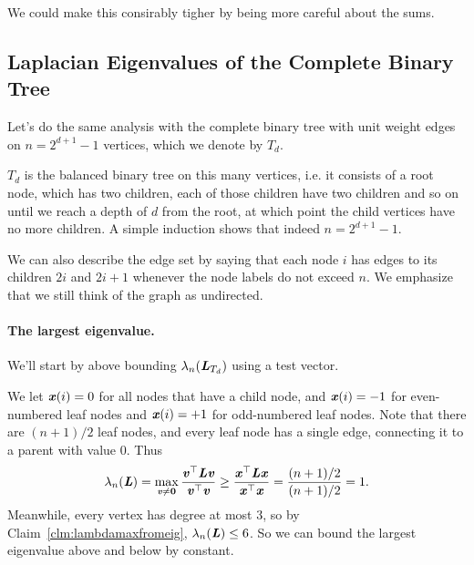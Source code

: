 We could make this consirably tigher by being more careful about the sums.

\subsection{Laplacian Eigenvalues of the Complete Binary Tree}

Let's do the same analysis with the complete binary tree with unit
weight edges on $n =
2^{d+1}-1$ vertices, which we
denote by $T_d$.

$T_d$ is the balanced binary tree on this many vertices, i.e. it
consists of a root node, which has two children, each of those
children have two children and so on until we reach a depth of $d$
from the root, at which point the child vertices have no more
children.
A simple induction shows that indeed $n = 2^{d+1}-1$.

We can also describe the edge set by saying that each node $i$ has
edges to its children $2i$ and $2i+1$ whenever the node labels do not
exceed $n$.
We emphasize that we still think of the graph as undirected.


\paragraph{The largest eigenvalue.}
We'll start by above bounding $\lambda_n(\boldsymbol{\mathit{L}}_{T_d})$ using a test
vector.

We let $\boldsymbol{\mathit{x}}(i) = 0$ for all nodes that have a child node, and $\boldsymbol{\mathit{x}}(i)
= -1$ for even-numbered leaf nodes and $\boldsymbol{\mathit{x}}(i) = +1$ for odd-numbered
leaf nodes.
Note that there are $(n+1)/2$ leaf nodes, and every leaf node has a
single edge, connecting it to a parent with value $0$.
Thus
\begin{align}
\lambda_n(\boldsymbol{\mathit{L}}) = \max_{ \substack{ \boldsymbol{\mathit{v}} \neq \boldsymbol{0}} } \frac{
  \boldsymbol{\mathit{v}}^\top \boldsymbol{\mathit{L}} \boldsymbol{\mathit{v}}}{ \boldsymbol{\mathit{v}}^\top \boldsymbol{\mathit{v}}}
  \geq
  \frac{\boldsymbol{\mathit{x}}^\top \boldsymbol{\mathit{L}} \boldsymbol{\mathit{x}}}
  { \boldsymbol{\mathit{x}}^\top \boldsymbol{\mathit{x}}}
  =
  \frac{ (n+1)/2 }{ (n+1)/2 }
  = 1
  .
\end{align}
Meanwhile, every vertex has degree at most 3, so by
Claim~\ref{clm:lambdamaxfromeig}, $\lambda_n(\boldsymbol{\mathit{L}}) \leq 6$.
So we can bound the largest eigenvalue above and below by constant.


